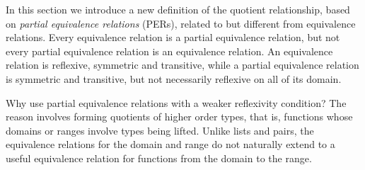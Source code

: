 \documentclass[envcountsame,runningheads]{llncs}
\newcommand{\quotient}{partial equivalence}
\begin{document}
In this section we introduce a new definition of the quotient
relationship, based on {\it \quotient{} relations}
(PERs), related to but different from equivalence relations.
Every equivalence relation is a \quotient{} relation, but
not every \quotient{} relation is an equivalence relation.
An equivalence relation is reflexive, symmetric and transitive,
while a \quotient{} relation is symmetric and transitive, but not
necessarily reflexive on all of its domain.

Why use \quotient{} relations with a weaker reflexivity condition?
The reason involves forming quotients of higher order types, that is,
functions whose domains or ranges involve types being lifted.  Unlike lists
and pairs, the equivalence relations for the domain and range do not
naturally extend to a useful equivalence relation for functions
from the domain to the range.
\end{document}
